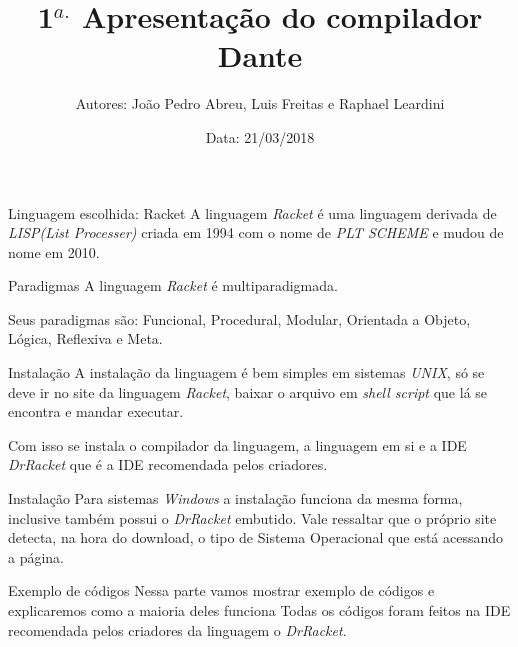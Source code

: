 \documentclass{beamer}
\title[Compiladores 2018.1]{1$^{a.}$ Apresentação do compilador Dante}
\author[Abrev.]{Autores: João Pedro Abreu, Luis Freitas e Raphael Leardini}
\institute[UFF]{Universidade Federal Fluminense}
\date{Data: 21/03/2018}
\begin{document}

\begin{frame}[plain]

\titlepage

\end{frame}


\begin{frame}{Linguagem escolhida: Racket}
A linguagem \textit{Racket} é uma linguagem derivada de \textit{LISP(List Processer)} criada em 1994 com o nome de \textit{PLT SCHEME} e mudou de nome em 2010.
\end{frame}


\begin{frame}{Paradigmas}
A linguagem \textit{Racket} é multiparadigmada.

Seus paradigmas são: Funcional, Procedural, Modular, Orientada a Objeto, Lógica, Reflexiva e Meta.

\end{frame}


\begin{frame}{Instalação}
A instalação da linguagem é bem simples em sistemas \textit{UNIX}, só se deve ir no site da linguagem \textit{Racket}, baixar o arquivo em \textit{shell script} que lá se encontra e mandar executar.

Com isso se instala o compilador da linguagem, a linguagem em si e a IDE \textit{DrRacket} que é a IDE recomendada pelos criadores.



\end{frame}


\begin{frame}{Instalação}
Para sistemas \textit{Windows} a instalação funciona da mesma forma, inclusive também possui o \textit{DrRacket} embutido. Vale ressaltar que o próprio site detecta, na hora do download, o tipo de Sistema Operacional que está acessando a página.

\end{frame}


\begin{frame}{Exemplo de códigos}
Nessa parte vamos mostrar exemplo de códigos e explicaremos como a maioria deles funciona
Todas os códigos foram feitos na IDE recomendada pelos criadores da linguagem o \textit{DrRacket}.
\end{frame}
\end{document}
